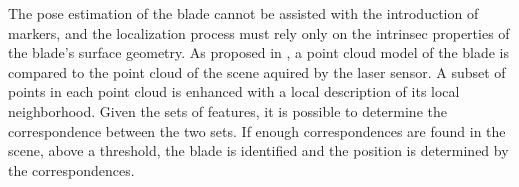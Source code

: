 The pose estimation of the blade cannot be assisted with the introduction of
markers, and the localization process must rely only on the intrinsec properties
of the blade's surface geometry. As proposed in \cite{Tombari2010a}, a point
cloud model of the blade is compared to the point cloud of the scene aquired by
the laser sensor. A subset of points in each point cloud is enhanced with a
local description of its local neighborhood. Given the sets of features, it is
possible to determine the correspondence between the two sets. If enough
correspondences are found in the scene, above a threshold, the blade is
identified and the position is determined by the correspondences.
